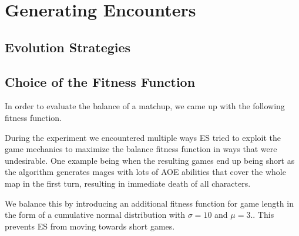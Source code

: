 \chapter{Generating Encounters}

\section{Evolution Strategies}

\section{Choice of the Fitness Function}

In order to evaluate the balance of a matchup, we came up with the following fitness function.

During the experiment we encountered multiple ways ES tried to exploit the game
mechanics to maximize the balance fitness function in ways that were
undesirable. One example being when the resulting games end up being short as
the algorithm generates mages with lots of AOE abilities that cover the whole
map in the first turn, resulting in immediate death of all characters.

We balance this by introducing an additional fitness function for game length
in the form of a cumulative normal distribution with $\sigma = 10$ and $\mu =
3$..  This prevents ES from moving towards
short games.
